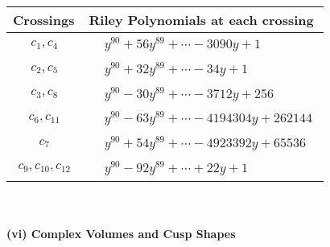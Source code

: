 \documentclass[1p]{elsarticle_modified}
\theoremstyle{definition}
\begin{document}
\begin{tabular}{m{50pt}|m{274pt}}
Crossings & \hspace{64pt}Riley Polynomials at each crossing \\
\hline $$\begin{aligned}c_{1},c_{4}\end{aligned}$$&$\begin{aligned}
&y^{90}+56 y^{89}+\cdots-3090 y+1
\end{aligned}$\\
\hline $$\begin{aligned}c_{2},c_{5}\end{aligned}$$&$\begin{aligned}
&y^{90}+32 y^{89}+\cdots-34 y+1
\end{aligned}$\\
\hline $$\begin{aligned}c_{3},c_{8}\end{aligned}$$&$\begin{aligned}
&y^{90}-30 y^{89}+\cdots-3712 y+256
\end{aligned}$\\
\hline $$\begin{aligned}c_{6},c_{11}\end{aligned}$$&$\begin{aligned}
&y^{90}-63 y^{89}+\cdots-4194304 y+262144
\end{aligned}$\\
\hline $$\begin{aligned}c_{7}\end{aligned}$$&$\begin{aligned}
&y^{90}+54 y^{89}+\cdots-4923392 y+65536
\end{aligned}$\\
\hline $$\begin{aligned}c_{9},c_{10},c_{12}\end{aligned}$$&$\begin{aligned}
&y^{90}-92 y^{89}+\cdots+22 y+1
\end{aligned}$\\
\hline
\end{tabular}\\~\\
\newpage\flushleft \textbf{(vi) Complex Volumes and Cusp Shapes}
\end{document}
